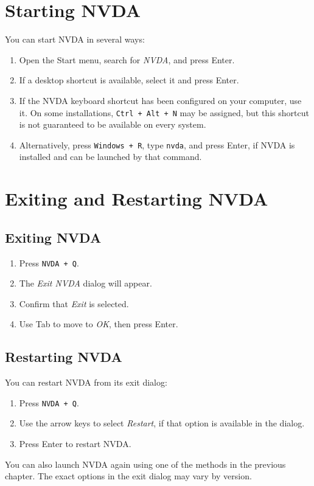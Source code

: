 \documentclass[11pt,oneside]{book}
\begin{document}
\chapter{Starting NVDA}
You can start NVDA in several ways:
\begin{enumerate}
	\item Open the Start menu, search for \textit{NVDA}, and press Enter.
	\item If a desktop shortcut is available, select it and press Enter.
	\item If the NVDA keyboard shortcut has been configured on your computer, use it. On some installations, \texttt{Ctrl + Alt + N} may be assigned, but this shortcut is not guaranteed to be available on every system.
	\item Alternatively, press \texttt{Windows + R}, type \texttt{nvda}, and press Enter, if NVDA is installed and can be launched by that command.
\end{enumerate}

\chapter{Exiting and Restarting NVDA}
\section{Exiting NVDA}
\begin{enumerate}
	\item Press \texttt{NVDA + Q}.
	\item The \textit{Exit NVDA} dialog will appear.
	\item Confirm that \textit{Exit} is selected.
	\item Use Tab to move to \textit{OK}, then press Enter.
\end{enumerate}

\section{Restarting NVDA}
You can restart NVDA from its exit dialog:
\begin{enumerate}
	\item Press \texttt{NVDA + Q}.
	\item Use the arrow keys to select \textit{Restart}, if that option is available in the dialog.
	\item Press Enter to restart NVDA.
\end{enumerate}
You can also launch NVDA again using one of the methods in the previous chapter. The exact options in the exit dialog may vary by version.
\end{document}
